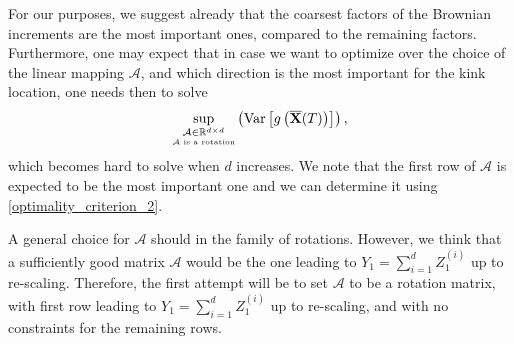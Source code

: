 \begin{remark}
For our purposes, we suggest already that the coarsest factors of the Brownian increments are the most important ones, compared to the remaining factors. Furthermore, one may expect that in case we want to optimize over the choice of the linear mapping $\mathcal{A}$, and which direction is the most important for the kink location, one needs then to solve
\begin{align}\label{transformation_optimality_criterion}
\underset{\underset{\mathcal{A} \text{ is a rotation}} {\mathcal{A} \in \mathbb{R}^{d \times d}}}{\operatorname{\sup}} \left( \text{Var}\left[g \left(\overline{\mathbf{X}}(T) \right)\right] \right) ,
\end{align}
which becomes hard to solve  when $d$ increases. We note that the first row of $\mathcal{A}$ is expected to be the most important one and we can determine it using \eqref{optimality_criterion_2}.
\end{remark}


\begin{remark}
A general choice for $\mathcal{A}$ should in the family of rotations. However, we think that a sufficiently good matrix $\mathcal{A}$ would be the one leading to $Y_1=\sum_{i=1}^d Z_1^{(i)}$ up to re-scaling. Therefore, the first attempt will be  to  set $\mathcal{A}$ to be a  rotation matrix, with first  row leading to $Y_1=\sum_{i=1}^d Z_1^{(i)}$ up to re-scaling, and with no constraints for the remaining rows.
\end{remark}

